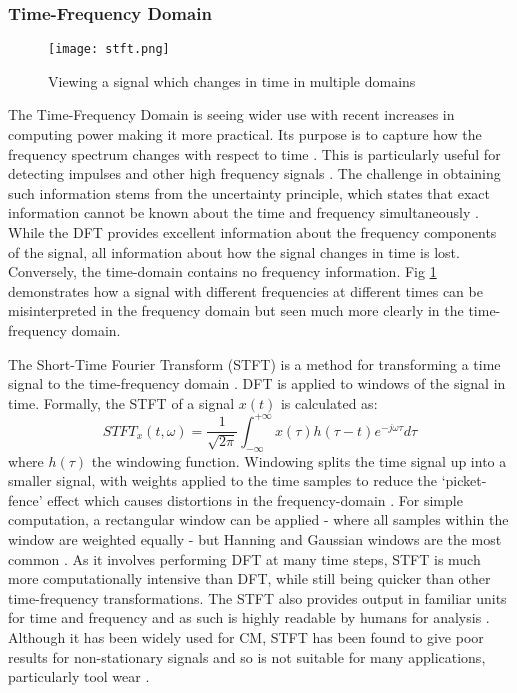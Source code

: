\subsubsection{Time-Frequency Domain}

\begin{figure}
    \centering
    \texttt{[image: stft.png]}
    \caption{Viewing a signal which changes in time in multiple domains}
    \label{fig:stft}
\end{figure}

The Time-Frequency Domain is seeing wider use with recent increases in computing power making it more practical.
Its purpose is to capture how the frequency spectrum changes with respect to time \cite{CM_dai_gao_2013}.
This is particularly useful for detecting impulses and other high frequency signals \cite{wavelet_tut}.
The challenge in obtaining such information stems from the uncertainty principle, which states that exact information cannot be known about the time and frequency simultaneously \cite{wavelet_tut}.
While the DFT provides excellent information about the frequency components of the signal, all information about how the signal changes in time is lost.
Conversely, the time-domain contains no frequency information.
Fig \ref{fig:stft} demonstrates how a signal with different frequencies at different times can be misinterpreted in the frequency domain but seen much more clearly in the time-frequency domain.


\par
The Short-Time Fourier Transform (STFT) is a method for transforming a time signal to the time-frequency domain \cite{CM_dai_gao_2013}.
DFT is applied to windows of the signal in time.
Formally, the STFT of a signal ${x(t)}$ is calculated as:
\begin{equation*}
STFT_x(t, \omega) = \frac{1}{\sqrt{2\pi}}\int^{+\infty}_{-\infty}x(\tau)h(\tau-t)e^{-j\omega \tau}d\tau
\end{equation*}
where $h(\tau)$ the windowing function.
Windowing splits the time signal up into a smaller signal, with weights applied to the time samples to reduce the `picket-fence' effect which causes distortions in the frequency-domain \cite{CM_randall}.
For simple computation, a rectangular window can be applied - where all samples within the window are weighted equally - but  Hanning and Gaussian windows are the most common \cite{CM_dai_gao_2013}.
As it involves performing DFT at many time steps, STFT is much more computationally intensive than DFT, while still being quicker than other time-frequency transformations.
The STFT also provides output in familiar units for time and frequency and as such is highly readable by humans for analysis \cite{wavelet_tut}\cite{CM_wavelets}.
Although it has been widely used for CM, STFT has been found to give poor results for non-stationary signals and so is not suitable for many applications, particularly tool wear \cite{CM_wavelets}.
\par

